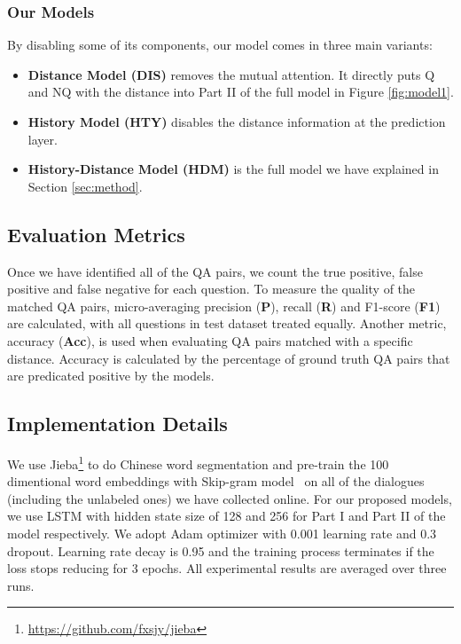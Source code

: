 \subsubsection{Our Models}
By disabling some of its components, our model comes in three main
variants:
\begin{itemize}

    \item \textbf{Distance Model (DIS)} removes the mutual attention. It directly puts Q and NQ with the distance into Part II of the full model in Figure \ref{fig:model1}.
    \item \textbf{History Model (HTY)} disables the distance information at the prediction layer.
    \item \textbf{History-Distance Model (HDM)} is the full model we have explained in Section \ref{sec:method}.
\end{itemize}


\subsection{Evaluation Metrics}


Once we have identified all of the QA pairs, we count the true positive, 
false positive and false negative for each question. 
To measure the quality of the matched QA pairs, micro-averaging 
precision (\textbf{P}), recall (\textbf{R}) and F1-score (\textbf{F1}) are 
calculated,  with all questions in test dataset treated equally. 
Another metric, accuracy (\textbf{Acc}), is used when evaluating QA pairs matched
with a specific distance. Accuracy is calculated by the percentage of ground
truth QA pairs that are predicated positive by the models.

\subsection{Implementation Details}
 
We use Jieba\footnote{\url{https://github.com/fxsjy/jieba}} to do Chinese word segmentation and pre-train the 100 dimentional word embeddings with Skip-gram model~\cite{mikolov2013efficient} on all of the dialogues (including the unlabeled ones) we have collected online. For our proposed models, we use LSTM with hidden state size of 128 and 256 for Part I and Part II of the model respectively. We adopt Adam optimizer with 0.001 learning rate and 0.3 dropout. 
Learning rate decay is 0.95 and the training process terminates if the 
loss stops reducing for 3 epochs. All experimental results are 
averaged over three runs.

